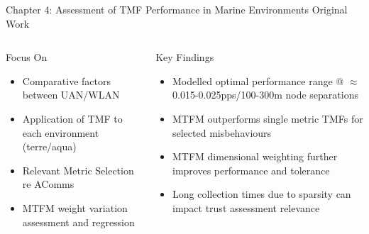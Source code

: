 \documentclass[aspectratio=169]{beamer}
\begin{document}
\begin{frame}{Chapter 4: Assessment of TMF Performance in Marine Environments}
  Original Work
  \begin{columns}
    \begin{column}{0.5\textwidth}
      \begin{block}{Focus On}
        \begin{itemize}
          \item Comparative factors between UAN/WLAN
          \item Application of TMF to each environment (terre/aqua)
	      \item Relevant Metric Selection re AComms
          \item MTFM weight variation assessment and regression
        \end{itemize}
      \end{block}
    \end{column}
    \begin{column}{0.5\textwidth}
      \begin{exampleblock}{Key Findings}
        \begin{itemize}
          \item Modelled optimal performance range @ $\approx$0.015-0.025pps/100-300m node separations
          \item MTFM outperforms single metric TMFs for selected misbehaviours
          \item MTFM dimensional weighting further improves performance and tolerance
          \item Long collection times due to sparsity can impact trust assessment relevance

        \end{itemize}
      \end{exampleblock}
    \end{column}
  \end{columns}

\end{frame}
\end{document}
